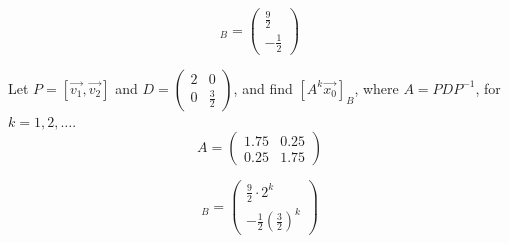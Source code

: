 \begin{equation}
    [\Vec{x_0}]_B = \begin{pmatrix}
        \frac{9}{2} \\ -\frac{1}{2}
    \end{pmatrix}
\end{equation}

\noindent
Let \(P=[\Vec{v_1}, \Vec{v_2}]\) and \(D=\begin{pmatrix}
    2 & 0 \\ 0 & \frac{3}{2}
\end{pmatrix}\), and find \([A^k\Vec{x_0}]_B\), where \(A=PDP^{-1}\), for \(k=1,2,\dots\).
\begin{equation}
    A = \begin{pmatrix}
        1.75 & 0.25 \\ 0.25 & 1.75
    \end{pmatrix}
\end{equation}

\begin{equation}
    [A^k\Vec{x_0}]_B = \begin{pmatrix}
        \frac{9}{2} \cdot 2^k \\ -\frac{1}{2}(\frac{3}{2})^k
    \end{pmatrix}
\end{equation}